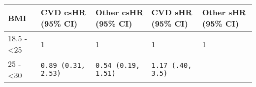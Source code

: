 \documentclass[]{article}
\begin{document}
\begin{longtable}[]{@{}lllll@{}}
\toprule
\begin{minipage}[b]{0.10\columnwidth}\raggedright\strut
BMI\strut
\end{minipage} & \begin{minipage}[b]{0.20\columnwidth}\raggedright\strut
CVD csHR (95\% CI)\strut
\end{minipage} & \begin{minipage}[b]{0.20\columnwidth}\raggedright\strut
Other csHR (95\% CI)\strut
\end{minipage} & \begin{minipage}[b]{0.19\columnwidth}\raggedright\strut
CVD sHR (95\% CI)\strut
\end{minipage} & \begin{minipage}[b]{0.19\columnwidth}\raggedright\strut
Other sHR (95\% CI)\strut
\end{minipage}\tabularnewline
\midrule
\endhead
\begin{minipage}[t]{0.10\columnwidth}\raggedright\strut
18.5 - \textless{}25\strut
\end{minipage} & \begin{minipage}[t]{0.20\columnwidth}\raggedright\strut
1\strut
\end{minipage} & \begin{minipage}[t]{0.20\columnwidth}\raggedright\strut
1\strut
\end{minipage} & \begin{minipage}[t]{0.19\columnwidth}\raggedright\strut
1\strut
\end{minipage} & \begin{minipage}[t]{0.19\columnwidth}\raggedright\strut
1\strut
\end{minipage}\tabularnewline
\begin{minipage}[t]{0.10\columnwidth}\raggedright\strut
25 - \textless{}30\strut
\end{minipage} & \begin{minipage}[t]{0.20\columnwidth}\raggedright\strut
\tt{0.89} (\tt{0.31}, \tt{2.53})\strut
\end{minipage} & \begin{minipage}[t]{0.20\columnwidth}\raggedright\strut
\tt{0.54} (\tt{0.19}, \tt{1.51})\strut
\end{minipage} & \begin{minipage}[t]{0.19\columnwidth}\raggedright\strut
\tt{1.17} (.40, 3.5)\strut
\end{minipage} & \begin{minipage}[t]{0.19\columnwidth}\raggedright\strut

\end{minipage}
\end{longtable}
\end{document}
